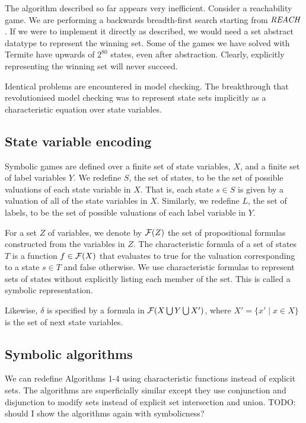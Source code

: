 The algorithm described so far appears very inefficient. Consider a reachability game. We are performing a backwards breadth-first search starting from $\mathit{REACH}$. If we were to implement it directly as described, we would need a set abstract datatype to represent the winning set. Some of the games we have solved with Termite have upwards of $2^{80}$ states, even after abstraction. Clearly, explicitly representing the winning set will never succeed. 

Identical problems are encountered in model checking. The breakthrough that revolutionised model checking was to represent state sets implicitly as a characteristic equation over state variables.

\subsection{State variable encoding}

Symbolic games are defined over a finite set of state variables, $X$, and a finite set of label variables $Y$. We redefine $S$, the set of states, to be the set of possible valuations of each state variable in $X$. That is, each state $s \in S$ is given by a valuation of all of the state variables in $X$. Similarly, we redefine $L$, the set of labels, to be the set of possible valuations of each label variable in $Y$.

For a set $Z$ of variables, we denote by $\mathcal{F}(Z)$ the set of propositional formulas constructed from the variables in $Z$. The characteristic formula of a set of states $T$ is a function $f \in \mathcal{F}(X)$ that evaluates to true for the valuation corresponding to a state $s \in T$ and false otherwise. We use characteristic formulas to represent sets of states without explicitly listing each member of the set. This is called a symbolic representation.

Likewise, $\delta$ is specified by a formula in $\mathcal{F}(X \bigcup Y \bigcup X')$, where $X' = \{x' \mid x \in X \}$ is the set of next state variables.

\subsection{Symbolic algorithms}

We can redefine Algorithms 1-4 using characteristic functions instead of explicit sets. The algorithms are superficially similar except they use conjunction and disjunction to modify sets instead of explicit set intersection and union. TODO: should I show the algorithms again with symbolicness?

